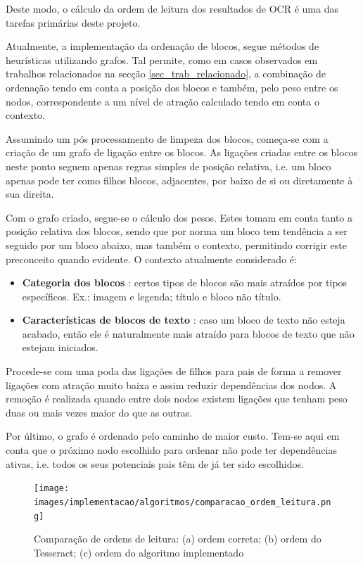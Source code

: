 Deste modo, o cálculo da ordem de leitura dos resultados de OCR é uma das tarefas primárias deste projeto.

Atualmente, a implementação da ordenação de blocos, segue métodos de heurísticas utilizando grafos. Tal permite, como em casos observados em trabalhos relacionados na secção  \ref{sec_trab_relacionado}, a combinação de ordenação tendo em conta a posição dos blocos e também, pelo peso entre os nodos, correspondente a um nível de atração calculado tendo em conta o contexto.

Assumindo um pós processamento de limpeza dos blocos, começa-se com a criação de um grafo de ligação entre os blocos. As ligações criadas entre os blocos neste ponto seguem apenas regras simples de posição relativa, i.e. um bloco apenas pode ter como filhos blocos, adjacentes, por baixo de si ou diretamente à sua direita.

Com o grafo criado, segue-se o cálculo dos pesos. Estes tomam em conta tanto a posição relativa dos blocos, sendo que por norma um bloco tem tendência a ser seguido por um bloco abaixo, mas também o contexto, permitindo corrigir este preconceito quando evidente. O contexto atualmente considerado é:
\begin{itemize}
    \item \textbf{Categoria dos blocos} : certos tipos de blocos são mais atraídos por tipos específicos. Ex.: imagem e legenda; título e bloco não título.
    \item \textbf{Características de blocos de texto} : caso um bloco de texto não esteja acabado, então ele é naturalmente mais atraído para blocos de texto que não estejam iniciados.
\end{itemize}

Procede-se com uma poda das ligações de filhos para pais de forma a remover ligações com atração muito baixa e assim reduzir dependências dos nodos. A remoção é realizada quando entre dois nodos existem ligações que tenham peso duas ou mais vezes maior do que as outras.

Por último, o grafo é ordenado pelo caminho de maior custo. Tem-se aqui em conta que o próximo nodo escolhido para ordenar não pode ter dependências ativas, i.e. todos os seus potenciais pais têm de já ter sido escolhidos.

\begin{figure}[H]
    \hspace*{-4.5cm}
    \texttt{[image: images/implementacao/algoritmos/comparacao\_ordem\_leitura.png]}
    \caption{Comparação de ordens de leitura: (a) ordem correta; (b) ordem do Tesseract; (c) ordem do algoritmo implementado}
    \label{fig:comp_reading_order}
\end{figure}

